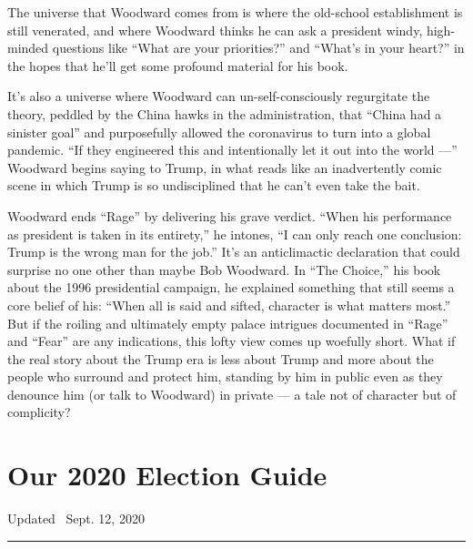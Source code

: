 The universe that Woodward comes from is where the old-school
establishment is still venerated, and where Woodward thinks he can ask a
president windy, high-minded questions like ``What are your
priorities?'' and ``What's in your heart?'' in the hopes that he'll get
some profound material for his book.

It's also a universe where Woodward can un-self-consciously regurgitate
the theory, peddled by the China hawks in the administration, that
``China had a sinister goal'' and purposefully allowed the coronavirus
to turn into a global pandemic. ``If they engineered this and
intentionally let it out into the world ---'' Woodward begins saying to
Trump, in what reads like an inadvertently comic scene in which Trump is
so undisciplined that he can't even take the bait.

Woodward ends ``Rage'' by delivering his grave verdict. ``When his
performance as president is taken in its entirety,'' he intones, ``I can
only reach one conclusion: Trump is the wrong man for the job.'' It's an
anticlimactic declaration that could surprise no one other than maybe
Bob Woodward. In ``The Choice,'' his book about the 1996 presidential
campaign, he explained something that still seems a core belief of his:
``When all is said and sifted, character is what matters most.'' But if
the roiling and ultimately empty palace intrigues documented in ``Rage''
and ``Fear'' are any indications, this lofty view comes up woefully
short. What if the real story about the Trump era is less about Trump
and more about the people who surround and protect him, standing by him
in public even as they denounce him (or talk to Woodward) in private ---
a tale not of character but of complicity?

\hypertarget{our-2020-election-guide}{%
\section{Our 2020 Election Guide}\label{our-2020-election-guide}}

Updated ~Sept. 12, 2020

\begin{center}\rule{0.5\linewidth}{\linethickness}\end{center}

